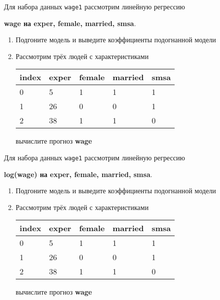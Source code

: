 \begin{exercise}
Для набора данных \texttt{wage1} рассмотрим линейную регрессию 
\begin{center}
	\textbf{wage на exper, female, married, smsa}.
\end{center}
\begin{enumerate}
	\item Подгоните модель и выведите коэффициенты подогнанной модели
	\item Рассмотрим трёх людей с характеристиками
	\begin{center}
		\begin{tabular}{|l||l|l|l|l|}\hline
			index & exper & female & married & smsa \\ \hline\hline
			0 & 5 & 1 & 1 & 1  \\
			1 & 26 & 0 & 0 & 1 \\
			2 & 38 & 1 & 1 & 0 \\ \hline
		\end{tabular}
	\end{center}
	вычислите прогноз \textbf{wage}
\end{enumerate}
\end{exercise}

\begin{exercise}
Для набора данных \texttt{wage1} рассмотрим линейную регрессию 
\begin{center}
	\textbf{log(wage) на exper, female, married, smsa}.
\end{center}
\begin{enumerate}
	\item Подгоните модель и выведите коэффициенты подогнанной модели
	\item Рассмотрим трёх людей с характеристиками
	\begin{center}
		\begin{tabular}{|l||l|l|l|l|}\hline
			index & exper & female & married & smsa \\ \hline\hline
			0 & 5 & 1 & 1 & 1  \\
			1 & 26 & 0 & 0 & 1 \\
			2 & 38 & 1 & 1 & 0 \\ \hline
		\end{tabular}
	\end{center}
	вычислите прогноз \textbf{wage}
\end{enumerate}
\end{exercise}

